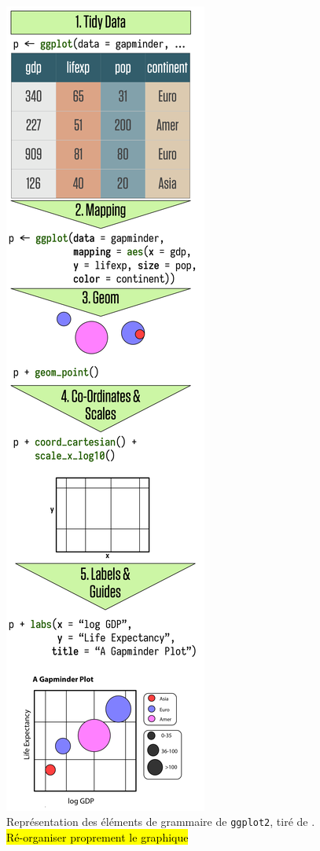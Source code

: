 	\paragraph*{}
	\begin{figure}
		\centering
		\includegraphics[width=.92\linewidth]{img/ch-03-ggplot-flow-vertical.png}
		\caption{Représentation des éléments de grammaire de \texttt{ggplot2}, tiré de \cite{healy_data_2018}.\\
			\hl{Ré-organiser proprement le graphique}%
		}
		\label{fig:socviz-ggplot2}
	\end{figure}
